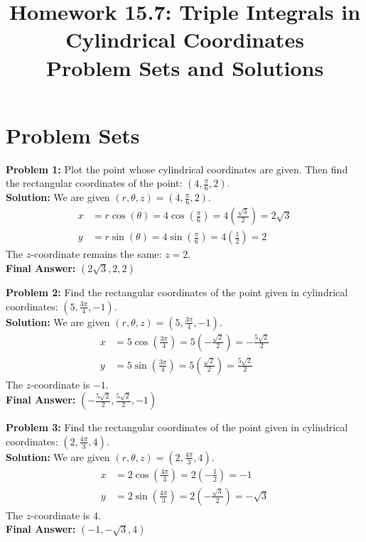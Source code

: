 \documentclass[12pt]{article}
\begin{document}
\title{Homework 15.7: Triple Integrals in Cylindrical Coordinates\\ \Large Problem Sets and Solutions}
\author{}
\date{}
\maketitle

\section*{Problem Sets}

\textbf{Problem 1:} Plot the point whose cylindrical coordinates are given. Then find the rectangular coordinates of the point: $(4, \frac{\pi}{6}, 2)$.
\\
\textbf{Solution:} We are given $(r, \theta, z) = (4, \frac{\pi}{6}, 2)$.
\begin{align*}
x &= r \cos(\theta) = 4 \cos\left(\frac{\pi}{6}\right) = 4 \left(\frac{\sqrt{3}}{2}\right) = 2\sqrt{3} \\
y &= r \sin(\theta) = 4 \sin\left(\frac{\pi}{6}\right) = 4 \left(\frac{1}{2}\right) = 2
\end{align*}
The $z$-coordinate remains the same: $z = 2$. 
\\
\textbf{Final Answer:} $(2\sqrt{3}, 2, 2)$
\vspace{0.5cm}

\textbf{Problem 2:} Find the rectangular coordinates of the point given in cylindrical coordinates: $(5, \frac{3\pi}{4}, -1)$.
\\
\textbf{Solution:} We are given $(r, \theta, z) = (5, \frac{3\pi}{4}, -1)$.
\begin{align*}
x &= 5 \cos\left(\frac{3\pi}{4}\right) = 5 \left(-\frac{\sqrt{2}}{2}\right) = -\frac{5\sqrt{2}}{2} \\
y &= 5 \sin\left(\frac{3\pi}{4}\right) = 5 \left(\frac{\sqrt{2}}{2}\right) = \frac{5\sqrt{2}}{2}
\end{align*}
The $z$-coordinate is $-1$.
\\
\textbf{Final Answer:} $\left(-\frac{5\sqrt{2}}{2}, \frac{5\sqrt{2}}{2}, -1\right)$
\vspace{0.5cm}

\textbf{Problem 3:} Find the rectangular coordinates of the point given in cylindrical coordinates: $(2, \frac{4\pi}{3}, 4)$.
\\
\textbf{Solution:} We are given $(r, \theta, z) = (2, \frac{4\pi}{3}, 4)$.
\begin{align*}
x &= 2 \cos\left(\frac{4\pi}{3}\right) = 2 \left(-\frac{1}{2}\right) = -1 \\
y &= 2 \sin\left(\frac{4\pi}{3}\right) = 2 \left(-\frac{\sqrt{3}}{2}\right) = -\sqrt{3}
\end{align*}
The $z$-coordinate is $4$.
\\
\textbf{Final Answer:} $(-1, -\sqrt{3}, 4)$
\vspace{0.5cm}
\end{document}
